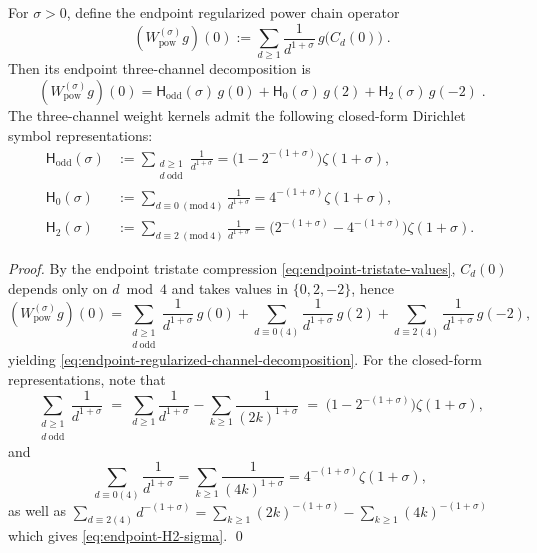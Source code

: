 \begin{proposition}\label{prop:endpoint-dirichlet-symbol-weights}
For \(\sigma>0\), define the endpoint regularized power chain operator
\begin{equation}\label{eq:endpoint-regularized-channel-operator}
\boxed{\;
(W_{\mathrm{pow}}^{(\sigma)}g)(0)
:=\sum_{d\ge 1}\frac{1}{d^{1+\sigma}}\,g\!\bigl(C_d(0)\bigr)\; }.
\end{equation}
Then its endpoint three-channel decomposition is
\begin{equation}\label{eq:endpoint-regularized-channel-decomposition}
\boxed{\;
(W_{\mathrm{pow}}^{(\sigma)}g)(0)
=\mathsf H_{\mathrm{odd}}(\sigma)\,g(0)
+\mathsf H_{0}(\sigma)\,g(2)
+\mathsf H_{2}(\sigma)\,g(-2)\; }.
\end{equation}
The three-channel weight kernels admit the following closed-form Dirichlet symbol representations:
\begin{align}
\mathsf H_{\mathrm{odd}}(\sigma)
&:=\sum_{\substack{d\ge 1\\ d\ \mathrm{odd}}}\frac{1}{d^{1+\sigma}}
=\bigl(1-2^{-(1+\sigma)}\bigr)\zeta(1+\sigma),\label{eq:endpoint-Hodd-sigma}\\
\mathsf H_{0}(\sigma)
&:=\sum_{d\equiv 0\ (\mathrm{mod}\ 4)}\frac{1}{d^{1+\sigma}}
=4^{-(1+\sigma)}\zeta(1+\sigma),\label{eq:endpoint-H0-sigma}\\
\mathsf H_{2}(\sigma)
&:=\sum_{d\equiv 2\ (\mathrm{mod}\ 4)}\frac{1}{d^{1+\sigma}}
=\bigl(2^{-(1+\sigma)}-4^{-(1+\sigma)}\bigr)\zeta(1+\sigma).\label{eq:endpoint-H2-sigma}
\end{align}
\end{proposition}
\begin{proof}
By the endpoint tristate compression \eqref{eq:endpoint-tristate-values}, \(C_d(0)\) depends only on \(d\bmod 4\) and takes values in \(\{0,2,-2\}\), hence
\[
(W_{\mathrm{pow}}^{(\sigma)}g)(0)
=\sum_{\substack{d\ge 1\\ d\ \mathrm{odd}}}\frac{1}{d^{1+\sigma}}\,g(0)
+\sum_{d\equiv 0(4)}\frac{1}{d^{1+\sigma}}\,g(2)
+\sum_{d\equiv 2(4)}\frac{1}{d^{1+\sigma}}\,g(-2),
\]
yielding \eqref{eq:endpoint-regularized-channel-decomposition}.
For the closed-form representations, note that
\[
\sum_{\substack{d\ge 1\\ d\ \mathrm{odd}}}\frac{1}{d^{1+\sigma}}
\;=\;\sum_{d\ge 1}\frac{1}{d^{1+\sigma}}-\sum_{k\ge 1}\frac{1}{(2k)^{1+\sigma}}
\;=\;\bigl(1-2^{-(1+\sigma)}\bigr)\zeta(1+\sigma),
\]
and
\[
\sum_{d\equiv 0(4)}\frac{1}{d^{1+\sigma}}
=\sum_{k\ge 1}\frac{1}{(4k)^{1+\sigma}}
=4^{-(1+\sigma)}\zeta(1+\sigma),
\]
as well as
\(
\sum_{d\equiv 2(4)}d^{-(1+\sigma)}
=\sum_{k\ge 1}(2k)^{-(1+\sigma)}-\sum_{k\ge 1}(4k)^{-(1+\sigma)}
\)
which gives \eqref{eq:endpoint-H2-sigma}. \qed
\end{proof}

